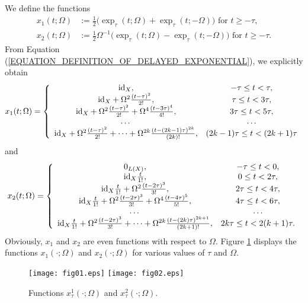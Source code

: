 \documentclass[12pt]{article}
\numberwithin{equation}{section}
\numberwithin{equation}{section}
\begin{document}
	We define the functions
	\begin{equation}
		\begin{split}
			x_{1}(t; \Omega) &:= \frac{1}{2} \big(\exp_{\tau}(t; \Omega) + \exp_{\tau}(t; -\Omega)\big) \text{ for } t \geq -\tau, \\
			x_{2}(t; \Omega) &:= \frac{1}{2} \Omega^{-1} \big(\exp_{\tau}(t; \Omega) - \exp_{\tau}(t; -\Omega)\big) \text{ for } t \geq -\tau. 
		\end{split}
		\label{EQUATION_FUNCTIONS_X_1_AND_X_2}
	\end{equation}
	From Equation (\ref{EQUATION_DEFINITION_OF_DELAYED_EXPONENTIAL}), we explicitly obtain
	\begin{equation}
		x_{1}(t; \Omega) = \left\{
		\begin{array}{cc}
			\mathrm{id}_{X}, & -\tau \leq t < \tau, \\
			\mathrm{id}_{X} + \Omega^{2} \frac{(t - \tau)^{2}}{2!}, & \tau \leq t < 3\tau, \\
			\mathrm{id}_{X} + \Omega^{2} \frac{(t - \tau)^{2}}{2!} + \Omega^{4} \frac{(t - 3\tau)^{4}}{4!}, & 3\tau \leq t < 5\tau, \\
			\dots & \dots \\
			\mathrm{id}_{X} + \Omega^{2} \frac{(t - \tau)^{2}}{2!} + \dots +
			\Omega^{2k} \frac{(t - (2k - 1) \tau)^{2k}}{(2k)!}, & (2k - 1) \tau \leq t < (2k + 1) \tau
		\end{array}\right.
		\notag
	\end{equation}
	and
	\begin{equation}
		x_{2}(t; \Omega) = \left\{
		\begin{array}{cc}
			0_{L(X)}, & -\tau \leq t < 0, \\
			\mathrm{id}_{X} \frac{t}{1!}, & 0 \leq t < 2\tau, \\
			\mathrm{id}_{X} \frac{t}{1!} + \Omega^{2} \frac{(t - 2\tau)^{3}}{3!}, & 2\tau \leq t < 4\tau, \\
			\mathrm{id}_{X} \frac{t}{1!} + \Omega^{2} \frac{(t - 2\tau)^{3}}{3!} +
			\Omega^{4} \frac{(t - 4\tau)^{5}}{5!}, & 4\tau \leq t < 6\tau, \\
			\dots & \dots \\
			\mathrm{id}_{X} \frac{t}{1!} + \Omega^{2} \frac{(t - 2\tau)^{3}}{3!} + \dots +
			\Omega^{2k} \frac{(t - (2k) \tau)^{2k+1}}{(2k + 1)!}, & 2k \tau \leq t < 2(k + 1) \tau.
		\end{array}\right.
		\notag
	\end{equation}
	Obviously, $x_{1}$ and $x_{2}$ are even functions with respect to $\Omega$.
	Figure \ref{FIGURE_FUNCTIONS_X1_AND_X2} displays the functions $x_{1}(\cdot; \Omega)$ and $x_{2}(\cdot; \Omega)$ for various values of $\tau$ and $\Omega$.
	\begin{figure}[h!]
		\centering
		\texttt{[image: fig01.eps]}
		\texttt{[image: fig02.eps]}
		\caption{Functions $x_{\tau}^{1}(\cdot; \Omega)$ and $x_{\tau}^{2}(\cdot; \Omega)$. \label{FIGURE_FUNCTIONS_X1_AND_X2}}
	\end{figure}
\end{document}
